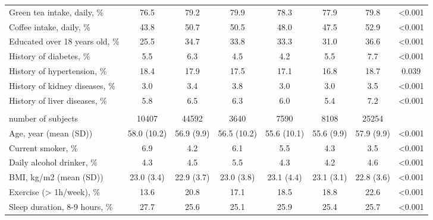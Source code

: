\documentclass[nutrients,article,submit,moreauthors,pdftex]{mdpi}
\begin{document}
\begin{table}[H]
\begin{tabular}[t]{lccccccc}
\hspace{1em}Green tea intake, daily, \% & 76.5 & 79.2 & 79.9 & 78.3 & 77.9 & 79.8 & <0.001\\
\rowcolor{gray!6}  \hspace{1em}Coffee intake, daily, \% & 43.8 & 50.7 & 50.5 & 48.0 & 47.5 & 52.9 & <0.001\\
\hspace{1em}Educated over 18 years old, \% & 25.5 & 34.7 & 33.8 & 33.3 & 31.0 & 36.6 & <0.001\\
\rowcolor{gray!6}  \hspace{1em}History of diabetes, \% & 5.5 & 6.3 & 4.5 & 4.2 & 5.5 & 7.7 & <0.001\\
\hspace{1em}History of hypertension, \% & 18.4 & 17.9 & 17.5 & 17.1 & 16.8 & 18.7 & 0.039\\
\rowcolor{gray!6}  \hspace{1em}History of kidney diseases, \% & 3.0 & 3.4 & 3.8 & 3.0 & 3.0 & 3.5 & <0.001\\
\hspace{1em}History of liver diseases, \% & 5.8 & 6.5 & 6.3 & 6.0 & 5.4 & 7.2 & <0.001\\
\rowcolor{gray!6}  \addlinespace[0.3em]
\multicolumn{8}{l}{\textbf{Women (n = 545999)}}\\
\hspace{1em}number of subjects & 10407 & 44592 & 3640 & 7590 & 8108 & 25254 & \\
\hspace{1em}Age, year (mean (SD)) & 58.0 (10.2) & 56.9 (9.9) & 56.5 (10.2) & 55.6 (10.1) & 55.6 (9.9) & 57.9 (9.9) & <0.001\\
\rowcolor{gray!6}  \hspace{1em}Current smoker, \% & 6.9 & 4.2 & 6.1 & 5.5 & 4.3 & 3.5 & <0.001\\
\hspace{1em}Daily alcohol drinker, \% & 4.3 & 4.5 & 5.5 & 4.3 & 4.2 & 4.6 & <0.001\\
\rowcolor{gray!6}  \hspace{1em}BMI, kg/m2 (mean (SD)) & 23.0 (3.4) & 22.9 (3.7) & 23.0 (3.8) & 23.1 (4.4) & 23.1 (3.1) & 22.8 (3.6) & <0.001\\
\hspace{1em}Exercise (> 1h/week), \% & 13.6 & 20.8 & 17.1 & 18.5 & 18.8 & 22.6 & <0.001\\
\rowcolor{gray!6}  \hspace{1em}Sleep duration, 8-9 hours, \% & 27.7 & 25.6 & 25.1 & 25.9 & 25.4 & 25.7 & <0.001\\

\end{tabular}
\end{table}
\end{document}
